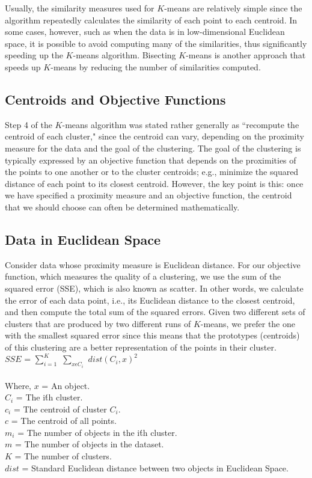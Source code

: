 Usually, the similarity measures used for $K$-means are relatively simple
since the algorithm repeatedly calculates the similarity of each point to each
centroid. In some cases, however, such as when the data is in low-dimensional
Euclidean space, it is possible to avoid computing many of the similarities,
thus significantly speeding up the $K$-means algorithm.   Bisecting $K$-means
is another approach that speeds up $K$-means by reducing the number of similarities computed.

\subsection{Centroids and Objective Functions}
Step 4 of the $K$-means algorithm was stated rather generally as ``recompute
the centroid of each cluster," since the centroid can vary, depending on the
proximity measure for the data and the goal of the clustering.  The goal of
the clustering is typically expressed by an objective function that depends on
the proximities of the points to one another or to the cluster centroids; e.g.,
minimize the squared distance of each point to its closest centroid. However,
the key point is this: once we have
specified a proximity measure and an objective function, the centroid that we
should choose can often be determined mathematically.

\subsection{Data in Euclidean Space}
Consider data whose proximity measure is Euclidean distance.
For our objective function, which measures the quality of a
clustering, we use the sum of the squared error (SSE), which is also known
as scatter.  In other words, we calculate the error of each data point, i.e., its
Euclidean distance to the closest centroid, and then compute the total sum
of the squared errors.  Given two different sets of clusters that are produced
by two different runs of $K$-means, we prefer the one with the smallest squared
error since this means that the prototypes (centroids) of this clustering are
a better representation of the points in their cluster.\\

\hangindent=0.5cm
$SSE$ = $\sum_{i=1}^{K}$ $\sum_{x \epsilon C_i}$ $dist(C_i, x)^2$
\\\\Where,
$x$ = An object.\\
$C_i$ = The i\'th cluster.\\
$c_i$ = The centroid of cluster $C_i$.\\
$c$ = The centroid of all points.\\
$m_i$ = The number of objects in the i\'th cluster.\\
$m$ = The number of objects in the dataset.\\
$K$ = The number of clusters.\\
$dist$ = Standard Euclidean distance between two objects in Euclidean Space.\\

